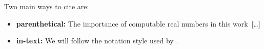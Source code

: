 

Two main ways to cite are:
\begin{itemize}
  \item \textbf{parenthetical:} The importance of computable real numbers \citep{Turing-computable-numbers} in this work~[\dots]
  \item \textbf{in-text:} We will follow the notation style used by \citet{Sipser-textbook}.
\end{itemize}

